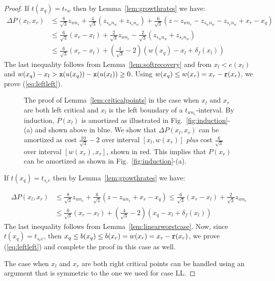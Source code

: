 \begin{proof}
If $t(x_q) = t_{\ast w}$ then by Lemma~\ref{lem:growthrates} we have:
\begin{align*}
\Delta P(x_l,x_r) & \leq \frac{8}{\sqrt{3}}z_{wn_e} + \frac{4}{\sqrt{3}}(z_{s_wn_w}+z_{s_en_w}) + \frac{6}{\sqrt{3}}(z - z_{wn_e} - z_{s_wn_w} - z_{s_en_w} + x_r - x_q) \\
                  & \leq \frac{6}{\sqrt{3}}(x_r - x_l) + \frac{2}{\sqrt{3}}z_{wn_e} - \frac{2}{\sqrt{3}}(z_{s_wn_w}+z_{s_en_w}) \\
                  & \leq \frac{6}{\sqrt{3}}(x_r - x_l) + \left(\frac{4}{\sqrt{3}}-2\right)(w(x_q)-x_l+\delta_f(x_l))
\end{align*}
The last inequality follows from Lemma~\ref{lem:softrecovery} and from 
$x_l < e(x_l)$ and $w(x_q)-x_l > {\tt x}(u(x_q)) - {\tt x}(u(x_l)) \geq 0$. 
Using $w(x_q) \leq w(x_r) = x_r - {\tt r}(x_r)$, we prove (\ref{eq:leftleft}).
\begin{figure}
\proofA
\caption{The proof of Lemma~\ref{lem:criticalpoints} in the case when $x_l$ and $x_r$ are both left critical and
$x_l$ is the left boundary of a $t_{wn_e}$-interval. By induction,
$P(x_l)$ is amortized as illustrated in Fig.~\ref{fig:induction}-(a) and shown
above in blue. We show that
$\Delta P(x_l,x_r)$ can be amortized as cost $\frac{10}{\sqrt{3}}-2$ over
interval $[x_l,w(x_r)]$ {\em plus} cost
$\frac{6}{\sqrt{3}}$ over interval $[w(x_r), x_r]$, shown in red.
This implies that $P(x_r)$ can be amortized as shown in Fig.~\ref{fig:induction}-(a).}
\label{fig:proofA}
\end{figure}

If $t(x_q) = t_{s_ee}$ then by Lemma~\ref{lem:growthrates} we have:

\begin{align*}
\Delta P(x_l,x_r) & \leq \frac{8}{\sqrt{3}}z_{wn_e} + \frac{6}{\sqrt{3}}(z - z_{wn_e} + x_r - x_q) \leq \frac{6}{\sqrt{3}}(x_r - x_l) + \frac{2}{\sqrt{3}}z_{wn_e} \\
                  & \leq \frac{6}{\sqrt{3}}(x_r - x_l) + \left(\frac{4}{\sqrt{3}}-2\right)(x_q-x_l+\delta_f(x_l))
\end{align*}
The last inequality follows from Lemma~\ref{lem:linearworstcase}.
Now, since $t(x_q) = t_{s_ee}$, then $x_q \leq b(x_q) \leq b(x_r) = w(x_r) = x_r - {\tt r}(x_r)$, we prove (\ref{eq:leftleft}) and complete the proof in this case as well.

 The case when $x_l$ and $x_r$ are both right critical
points can be handled using an argument that is symmetric to the one we used for
case LL.
 

\end{proof}
